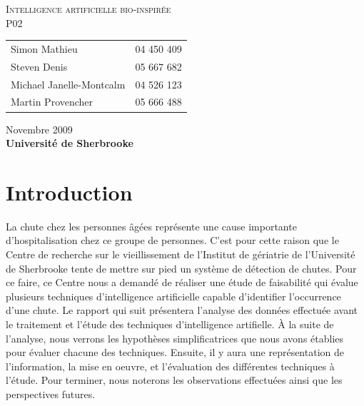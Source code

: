 \documentclass[12pt,letterpaper]{article}
\begin{document}
\renewcommand{\labelitemi}{$\bullet$}
\newcommand{\unit}[1]{\ \mathrm{#1}}
\newcommand{\degree}{\ensuremath{^\circ}}

\thispagestyle{empty}
\begin{center}
	\vspace{20pt}
	\large{\textsc{
		Intelligence artificielle bio-inspirée\\
	}}
	\vspace{20pt}
	\large{\textsc{
		P02
	}}
	\vfill
	\begin{tabular}{ll}
      Simon Mathieu & 04 450 409 \\
      Steven Denis & 05 667 682 \\
      Michael Janelle-Montcalm & 04 526 123 \\
      Martin Provencher &	05 666 488 \\
	\end{tabular}
	\vfill
	Novembre 2009 \\
	\textbf{Université de Sherbrooke}
	\vspace{20pt}
\end{center}
\clearpage
\begin{spacing}{0.1}
\tableofcontents
\end{spacing}
\clearpage

\section{Introduction} %
La chute chez les personnes âgées représente une cause importante d'hospitalisation chez ce groupe de personnes. C'est pour cette raison que le Centre de recherche sur le vieillissement de l'Institut de gériatrie de l'Université de Sherbrooke tente de mettre sur pied un système de détection de chutes. Pour ce faire, ce Centre nous a demandé de réaliser une étude de faisabilité qui évalue plusieurs techniques d'intelligence artificielle capable d'identifier l'occurrence d'une chute. Le rapport qui suit présentera l'analyse des données effectuée avant le traitement et l'étude des techniques d'intelligence artifielle. À la suite de l'analyse, nous verrons les hypothèses simplificatrices que nous avons établies pour évaluer chacune des techniques. Ensuite, il y aura une représentation de l'information, la mise en oeuvre, et l'évaluation des différentes techniques à l'étude. Pour terminer, nous noterons les observations effectuées ainsi que les perspectives futures.
\end{document}
